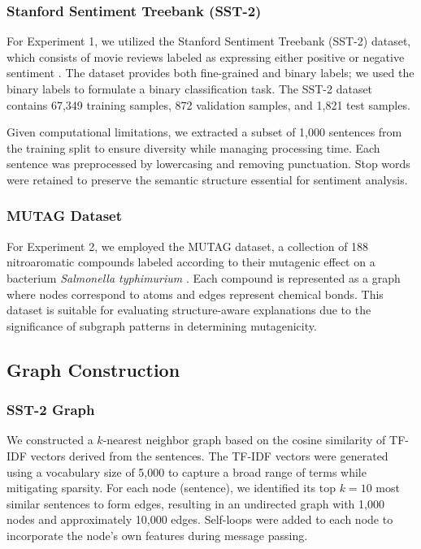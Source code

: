 \documentclass{article}
\begin{document}
\subsubsection{Stanford Sentiment Treebank (SST-2)}
For Experiment 1, we utilized the Stanford Sentiment Treebank (SST-2) dataset, which consists of movie reviews labeled as expressing either positive or negative sentiment \cite{socher2013recursive}. The dataset provides both fine-grained and binary labels; we used the binary labels to formulate a binary classification task. The SST-2 dataset contains 67,349 training samples, 872 validation samples, and 1,821 test samples.

Given computational limitations, we extracted a subset of 1,000 sentences from the training split to ensure diversity while managing processing time. Each sentence was preprocessed by lowercasing and removing punctuation. Stop words were retained to preserve the semantic structure essential for sentiment analysis.

\subsubsection{MUTAG Dataset}
For Experiment 2, we employed the MUTAG dataset, a collection of 188 nitroaromatic compounds labeled according to their mutagenic effect on a bacterium \textit{Salmonella typhimurium} \cite{debnath1991structure}. Each compound is represented as a graph where nodes correspond to atoms and edges represent chemical bonds. This dataset is suitable for evaluating structure-aware explanations due to the significance of subgraph patterns in determining mutagenicity.

\subsection{Graph Construction}
\subsubsection{SST-2 Graph}
We constructed a $k$-nearest neighbor graph based on the cosine similarity of TF-IDF vectors derived from the sentences. The TF-IDF vectors were generated using a vocabulary size of 5,000 to capture a broad range of terms while mitigating sparsity. For each node (sentence), we identified its top $k=10$ most similar sentences to form edges, resulting in an undirected graph with 1,000 nodes and approximately 10,000 edges. Self-loops were added to each node to incorporate the node's own features during message passing.
\end{document}

